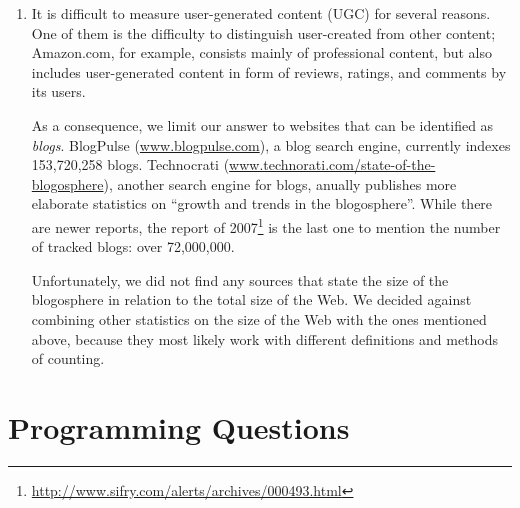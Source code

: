 \documentclass[a4paper,11pt,oneside]{book}
\begin{document}
\begin{enumerate}
	\item It is difficult to measure user-generated content (UGC) for several reasons. One of them is the difficulty to distinguish user-created from other content; Amazon.com, for example, consists mainly of professional content, but also includes user-generated content in form of reviews, ratings, and comments by its users.
	
	As a consequence, we limit our answer to websites that can be identified as \emph{blogs}. BlogPulse (\url{www.blogpulse.com}), a blog search engine, currently indexes 153,720,258 blogs. Technocrati (\url{www.technorati.com/state-of-the-blogosphere}), another search engine for blogs, anually publishes more elaborate statistics on ``growth and trends in the blogo\-sphere''. While there are newer reports, the report of 2007\footnote{\url{http://www.sifry.com/alerts/archives/000493.html}} is the last one to mention the number of tracked blogs: over 72,000,000. 
	
	Unfortunately, we did not find any sources that state the size of the blogo\-sphere in relation to the total size of the Web. We decided against combining other statistics on the size of the Web with the ones mentioned above, because they most likely work with different definitions and methods of counting.
\end{enumerate}



\chapter{Programming Questions}
\end{document}
